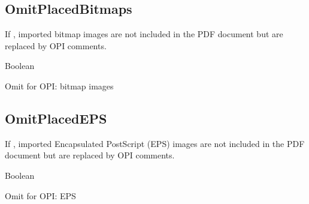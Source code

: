 \documentclass[letterpaper,12pt,english,openany,oneside]{sphinxmanual}
\begin{document}
\begin{sphinxVerbatim}[commandchars=\\\{\}]
\end{sphinxVerbatim}


\subsection{OmitPlacedBitmaps}
\label{\detokenize{PDF_Create_NewNamespaces:omitplacedbitmaps}}
If  , imported bitmap images are not included in the PDF document but are replaced by OPI comments.

\label{\detokenize{PDF_Create_NewNamespaces:type-34}}

Boolean

\label{\detokenize{PDF_Create_NewNamespaces:ui-name-34}}

Omit for OPI: bitmap images

\label{\detokenize{PDF_Create_NewNamespaces:default-value-33}}

\begin{sphinxVerbatim}[commandchars=\\\{\}]
\end{sphinxVerbatim}


\subsection{OmitPlacedEPS}
\label{\detokenize{PDF_Create_NewNamespaces:omitplacedeps}}
If  , imported Encapsulated PostScript (EPS) images are not included in the PDF document but are replaced by OPI comments.

\label{\detokenize{PDF_Create_NewNamespaces:type-35}}

Boolean

\label{\detokenize{PDF_Create_NewNamespaces:ui-name-35}}

Omit for OPI: EPS

\label{\detokenize{PDF_Create_NewNamespaces:default-value-34}}

\begin{sphinxVerbatim}[commandchars=\\\{\}]
\end{sphinxVerbatim}
\end{document}
